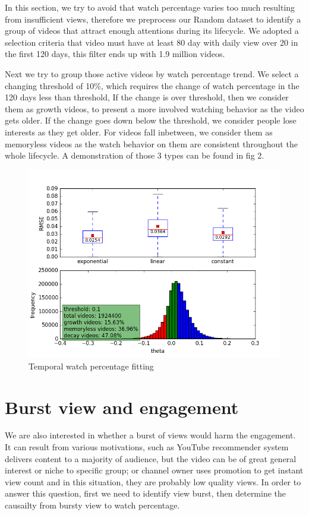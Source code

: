 In this section, we try to avoid that watch percentage varies too much resulting from insufficient views, therefore we preprocess our Random dataset to identify a group of videos that attract enough attentions during its lifecycle. We adopted a selection criteria that video must have at least 80 day with daily view over 20 in the first 120 days, this filter ends up with 1.9 million videos.

Next we try to group those active videos by watch percentage trend. We select a changing threshold of 10\%, which requires the change of watch percentage in the 120 days less than threshold, If the change is over threshold, then we consider them as growth videos, to present a more involved watching behavior as the video gets older. If the change goes down below the threshold, we consider people lose interests as they get older. For videos fall inbetween, we consider them as memoryless videos as the watch behavior on them are consistent throughout the whole lifecycle. A demonstration of those 3 types can be found in fig 2.

\begin{figure}
    \centering
    \includegraphics[scale=0.45]{image/wp_rmse_comp_and_theta_dist.png}
    \caption{Temporal watch percentage fitting}
\end{figure}

\section{Burst view and engagement}

We are also interested in whether a burst of views would harm the engagement. It can result from various motivations, such as YouTube recommender system delivers content to a majority of audience, but the video can be of great general interest or niche to specific group; or channel owner uses promotion to get instant view count and in this situation, they are probably low quality views. In order to answer this question, first we need to identify view burst, then determine the causailty from bursty view to watch percentage.

